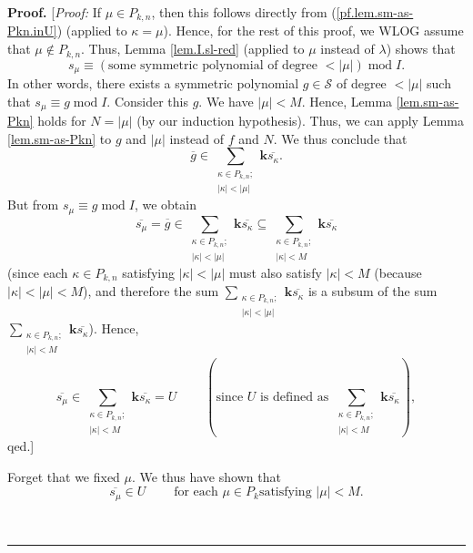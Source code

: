 \documentclass[numbers=enddot,12pt,final,onecolumn,notitlepage]{scrartcl}%
\theoremstyle{definition}
\newenvironment{proof}[1][Proof]{\noindent\textbf{#1.} }{\ \rule{0.5em}{0.5em}}
\let\sumnonlimits\sum
\renewcommand{\sum}{\sumnonlimits\limits}
\begin{document}
\begin{proof}
[\textit{Proof:} If $\mu\in P_{k,n}$, then this follows directly from
(\ref{pf.lem.sm-as-Pkn.inU}) (applied to $\kappa=\mu$). Hence, for the rest of
this proof, we WLOG assume that $\mu\notin P_{k,n}$. Thus, Lemma
\ref{lem.I.sl-red} (applied to $\mu$ instead of $\lambda$) shows that%
\[
s_{\mu}\equiv\left(  \text{some symmetric polynomial of degree }<\left\vert
\mu\right\vert \right)  \operatorname{mod}I.
\]
In other words, there exists a symmetric polynomial $g\in\mathcal{S}$ of
degree $<\left\vert \mu\right\vert $ such that $s_{\mu}\equiv
g\operatorname{mod}I$. Consider this $g$. We have $\left\vert \mu\right\vert
<M$. Hence, Lemma \ref{lem.sm-as-Pkn} holds for $N=\left\vert \mu\right\vert $
(by our induction hypothesis). Thus, we can apply Lemma \ref{lem.sm-as-Pkn} to
$g$ and $\left\vert \mu\right\vert $ instead of $f$ and $N$. We thus conclude
that%
\[
\overline{g}\in\sum_{\substack{\kappa\in P_{k,n};\\\left\vert \kappa
\right\vert <\left\vert \mu\right\vert }}\mathbf{k}\overline{s_{\kappa}}.
\]
But from $s_{\mu}\equiv g\operatorname{mod}I$, we obtain%
\[
\overline{s_{\mu}}=\overline{g}\in\sum_{\substack{\kappa\in P_{k,n}%
;\\\left\vert \kappa\right\vert <\left\vert \mu\right\vert }}\mathbf{k}%
\overline{s_{\kappa}}\subseteq\sum_{\substack{\kappa\in P_{k,n};\\\left\vert
\kappa\right\vert <M}}\mathbf{k}\overline{s_{\kappa}}%
\]
(since each $\kappa\in P_{k,n}$ satisfying $\left\vert \kappa\right\vert
<\left\vert \mu\right\vert $ must also satisfy $\left\vert \kappa\right\vert
<M$ (because $\left\vert \kappa\right\vert <\left\vert \mu\right\vert <M$),
and therefore the sum $\sum_{\substack{\kappa\in P_{k,n};\\\left\vert
\kappa\right\vert <\left\vert \mu\right\vert }}\mathbf{k}\overline{s_{\kappa}%
}$ is a subsum of the sum $\sum_{\substack{\kappa\in P_{k,n};\\\left\vert
\kappa\right\vert <M}}\mathbf{k}\overline{s_{\kappa}}$). Hence,%
\[
\overline{s_{\mu}}\in\sum_{\substack{\kappa\in P_{k,n};\\\left\vert
\kappa\right\vert <M}}\mathbf{k}\overline{s_{\kappa}}%
=U\ \ \ \ \ \ \ \ \ \ \left(  \text{since }U\text{ is defined as }%
\sum_{\substack{\kappa\in P_{k,n};\\\left\vert \kappa\right\vert
<M}}\mathbf{k}\overline{s_{\kappa}}\right)  ,
\]
qed.]

Forget that we fixed $\mu$. We thus have shown that%
\begin{equation}
\overline{s_{\mu}}\in U\ \ \ \ \ \ \ \ \ \ \text{for each }\mu\in P_{k}\text{
satisfying }\left\vert \mu\right\vert <M. \label{pf.lem.sm-as-Pkn.4}%
\end{equation}



\end{proof}
\end{document}
